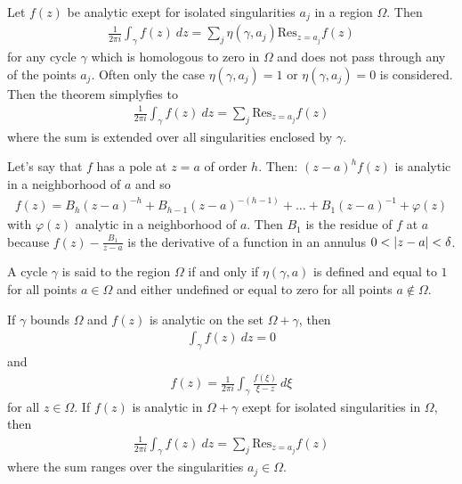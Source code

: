\begin{theorem}
    Let $f(z)$ be analytic exept for isolated singularities $a_j$ in a region
    $\Omega$. Then
    \begin{align*}
        \frac{1}{2 \pi i} \int_\gamma f(z) \ dz = \sum_j \eta(\gamma,a_j) \text{Res}_{z=a_j} f(z)
    \end{align*}
    for any cycle $\gamma$ which is homologous to zero in $\Omega$ and does not pass
    through any of the points $a_j$. Often only the case $\eta(\gamma,a_j) = 1$ or
    $\eta(\gamma,a_j) = 0$ is considered. Then the theorem simplyfies to
    \begin{align*}
        \frac{1}{2 \pi i} \int_\gamma f(z) \ dz = \sum_j \text{Res}_{z=a_j} f(z)
    \end{align*}
    where the sum is extended over all singularities enclosed by $\gamma$.
\end{theorem}

\begin{theorem}
    Let's say that $f$ has a pole at $z=a$ of order $h$. Then: $(z-a)^{h} f(z)$ is
    analytic in a neighborhood of $a$ and so
    \begin{align*}
        f(z) = B_h (z-a)^{-h} + B_{h-1} (z-a)^{-(h-1)} + \dots + B_1 (z-a)^{-1} + \varphi(z)
    \end{align*}
    with $\varphi (z)$ analytic in a neighborhood of $a$. Then $B_1$ is the residue
    of $f$ at $a$ because $f(z) - \frac{B_1}{z-a}$ is the derivative of a function
    in an annulus $0 < \left\vert z-a \right\vert < \delta$.
\end{theorem}

\begin{definition}[Bound]
    A cycle $\gamma$ is said to  the region $\Omega$ if and only if
    $\eta(\gamma,a)$ is defined and equal to $1$ for all points $a \in \Omega$
    and either undefined or equal to zero for all points $a \notin \Omega$. 
\end{definition}

\begin{theorem}
    If $\gamma$ bounds $\Omega$ and $f(z)$ is analytic on the set $\Omega + \gamma$,
    then
    \begin{align*}
        \int_\gamma f(z) \ dz = 0
    \end{align*}
    and
    \begin{align*}
        f(z) = \frac{1}{2 \pi i} \int_\gamma \frac{f(\xi)}{\xi - z} \ d \xi
    \end{align*}
    for all $z \in \Omega$. If $f(z)$ is analytic in $\Omega + \gamma$ exept for isolated
    singularities in $\Omega$, then
    \begin{align*}
        \frac{1}{2 \pi i} \int_\gamma f(z) \ dz = \sum_j \text{Res}_{z=a_j} f(z)
    \end{align*}
    where the sum ranges over the singularities $a_j \in \Omega$.
\end{theorem}

